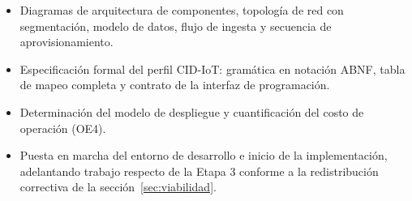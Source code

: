 \begin{itemize}
\item Diagramas de arquitectura de componentes, topología de red con segmentación, modelo de datos,
flujo de ingesta y secuencia de aprovisionamiento.
\item Especificación formal del perfil CID-IoT: gramática en notación ABNF, tabla de mapeo completa y
contrato de la interfaz de programación.
\item Determinación del modelo de despliegue y cuantificación del costo de operación (OE4).
\item Puesta en marcha del entorno de desarrollo e inicio de la implementación, adelantando trabajo
respecto de la Etapa 3 conforme a la redistribución correctiva de la sección~\ref{sec:viabilidad}.
\end{itemize}

